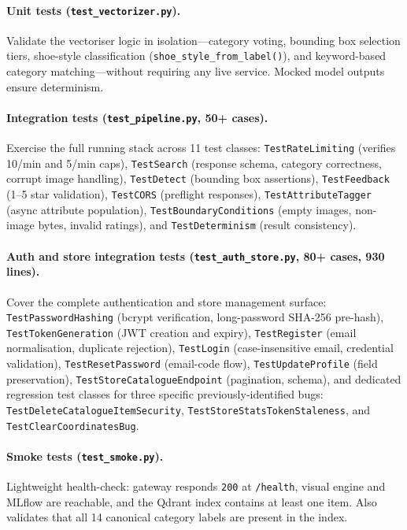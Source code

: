 \documentclass[12pt]{article}
\begin{document}
\paragraph{Unit tests (\texttt{test\_vectorizer.py}).}
Validate the vectoriser logic in isolation---category voting, bounding box selection tiers, shoe-style classification (\texttt{shoe\_style\_from\_label()}), and keyword-based category matching---without requiring any live service. Mocked model outputs ensure determinism.

\paragraph{Integration tests (\texttt{test\_pipeline.py}, 50+ cases).}
Exercise the full running stack across 11 test classes: \texttt{TestRateLimiting} (verifies 10/min and 5/min caps), \texttt{TestSearch} (response schema, category correctness, corrupt image handling), \texttt{TestDetect} (bounding box assertions), \texttt{TestFeedback} (1--5 star validation), \texttt{TestCORS} (preflight responses), \texttt{TestAttributeTagger} (async attribute population), \texttt{TestBoundaryConditions} (empty images, non-image bytes, invalid ratings), and \texttt{TestDeterminism} (result consistency).

\paragraph{Auth and store integration tests (\texttt{test\_auth\_store.py}, 80+ cases, 930 lines).}
Cover the complete authentication and store management surface: \texttt{TestPasswordHashing} (bcrypt verification, long-password SHA-256 pre-hash), \texttt{TestTokenGeneration} (JWT creation and expiry), \texttt{TestRegister} (email normalisation, duplicate rejection), \texttt{TestLogin} (case-insensitive email, credential validation), \texttt{TestResetPassword} (email-code flow), \texttt{TestUpdateProfile} (field preservation), \texttt{TestStoreCatalogueEndpoint} (pagination, schema), and dedicated regression test classes for three specific previously-identified bugs: \texttt{TestDeleteCatalogueItemSecurity}, \texttt{TestStoreStatsTokenStaleness}, and \texttt{TestClearCoordinatesBug}.

\paragraph{Smoke tests (\texttt{test\_smoke.py}).}
Lightweight health-check: gateway responds \texttt{200} at \texttt{/health}, visual engine and MLflow are reachable, and the Qdrant index contains at least one item. Also validates that all 14 canonical category labels are present in the index.
\end{document}
